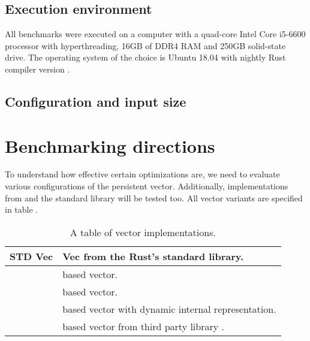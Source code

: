 \subsection{Execution environment}
All benchmarks were executed on a computer  with a quad-core Intel Core i5-6600 processor with hyperthreading, 16GB of DDR4 RAM and 250GB solid-state drive. The operating system of the choice is Ubuntu 18.04 with nightly Rust compiler version .

\subsection{Configuration and input size}

\section{Benchmarking directions}

To understand how effective certain optimizations are, we need to evaluate various configurations of the persistent vector. Additionally, implementations from \imrsvec{} and the standard library will be tested too. All vector variants are specified in table . 

\begin{table}
    \centering

    \begin{tabular} { |l| p{10cm} | }
        \hline
        STD Vec & Vec from the Rust's standard library. \\ \hline
        \rbvec{} & \rbtree{} based vector. \\ \hline
        \rrbvec{} & \rrbtree{} based vector. \\ \hline
        \pvec{} & \rrbtree{} based vector with dynamic internal representation. \\ \hline
        \imrsvec{} & \rrbtree{} based vector from third party library \imrsvec{}. \\ \hline        
    \end{tabular}
    
    \label{tab:vec-implementations}
    \caption{A table of vector implementations.}
\end{table}

